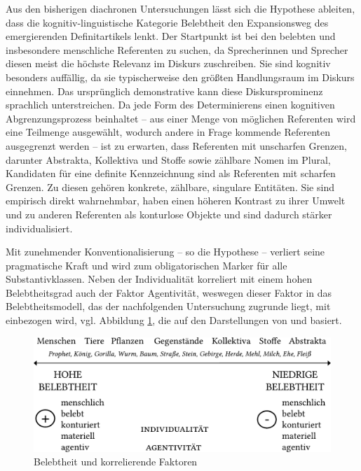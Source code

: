 Aus den bisherigen diachronen Untersuchungen lässt sich die Hypothese ableiten, dass die kognitiv-linguistische Kategorie Belebtheit den Expansionsweg des emergierenden Definitartikels lenkt. Der Startpunkt ist bei den belebten und insbesondere menschliche Referenten zu suchen, da Sprecherinnen und Sprecher diesen meist die höchste Relevanz im Diskurs zuschreiben.
Sie sind kognitiv besonders auffällig, da sie typischerweise den größten Handlungsraum im Diskurs einnehmen. Das ursprünglich demonstrative  kann diese Diskursprominenz sprachlich unterstreichen. Da jede Form des Determinierens einen kognitiven Abgrenzungsprozess beinhaltet -- aus einer Menge von möglichen Referenten wird eine Teilmenge ausgewählt, wodurch andere in Frage kommende Referenten ausgegrenzt werden -- ist zu erwarten, dass Referenten mit unscharfen Grenzen, darunter Abstrakta, Kollektiva und Stoffe sowie zählbare Nomen im Plural,  Kandidaten für eine definite Kennzeichnung sind als Referenten mit scharfen Grenzen. Zu diesen gehören konkrete, zählbare, singulare Entitäten. Sie sind empirisch direkt wahrnehmbar, haben einen höheren Kontrast zu ihrer Umwelt und zu anderen Referenten als konturlose Objekte und sind dadurch stärker individualisiert. 

Mit zunehmender Konventionalisierung -- so die Hypothese -- verliert  seine pragmatische Kraft und wird zum obligatorischen Marker für alle Substantivklassen. Neben der Individualität korreliert mit einem hohen Belebtheitsgrad auch der Faktor Agentivität, weswegen dieser Faktor in das Belebtheitsmodell, das der nachfolgenden Untersuchung zugrunde liegt, mit einbezogen wird, vgl. Abbildung \ref{abb:belebtheit-gesamt}, die auf den Darstellungen von \textcite[345]{Szczepaniak2011} und \textcite[98]{Nubling2012} basiert.  
    
\begin{figure}
\includegraphics[width=.75\textwidth]{images/Belebtheitsshierarchie.pdf}
\caption{Belebtheit und korrelierende Faktoren\label{abb:belebtheit-gesamt}}
\end{figure}


